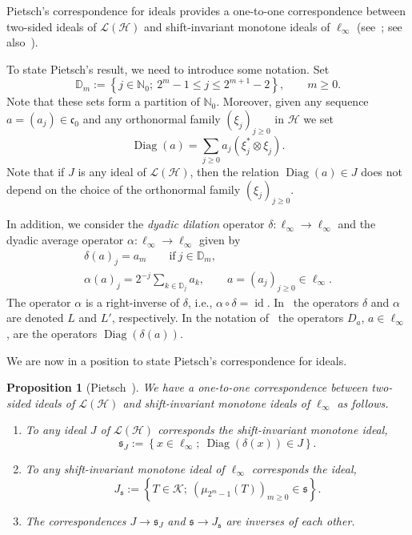 \documentclass[10pt, a4paper]{amsart}
\newcommand{\N}{\mathbb{N}}
\newcommand{\D}{\mathbb{D}}
\newcommand{\sL}{\mathscr{L}}
\newcommand{\sH}{\mathscr{H}}
\newcommand{\sK}{\mathscr{K}}
\newcommand{\fs}{\mathfrak{s}}
\newcommand{\co}{\mathfrak{c}_{0}}
\newcommand{\op}{\operatorname}
\numberwithin{equation}{section}
\newtheorem{proposition}[theorem]{Proposition}
\theoremstyle{definition}
\theoremstyle{remark}
\newcommand{\Diag}{\op{Diag}}
\begin{document}
Pietsch's correspondence for ideals provides a one-to-one correspondence between two-sided ideals of $\sL(\sH)$ and shift-invariant monotone ideals of $\ell_\infty$ (see~\cite{Pi:IEOT17}; see also~\cite{LSZ:Book}).

To state Pietsch's result, we need to introduce some notation. Set
\begin{equation*}
 \D_m:=\left\{j\in \N_0; \ 2^{m}-1\leq j \leq 2^{m+1}-2\right\}, \qquad m\geq 0.
\end{equation*}
Note that these sets form a partition of $\N_0$. Moreover, given any sequence $a=(a_j)\in \co$ and any orthonormal family $(\xi_j)_{j \geq 0}$ in $\sH$ we set
\begin{equation*}
 \Diag(a)= \sum_{j\geq 0} a_j \left(\xi_j^*\otimes \xi_j\right).
\end{equation*}
Note that if $J$ is any ideal of $\sL(\sH)$, then the relation $\Diag(a)\in J$ does not depend on the choice of the orthonormal family $(\xi_j)_{j \geq 0}$.

In addition, we consider the \emph{dyadic dilation} operator $\delta: \ell_\infty \rightarrow \ell_\infty$ and the dyadic average operator $\alpha:\ell_\infty \rightarrow \ell_\infty$ given by
\begin{gather*}
\delta (a)_j=a_m \qquad \text{if} \ j \in \D_m,\\
\alpha (a)_j= 2^{-j}\sum_{k\in \D_j} a_k, \qquad a=(a_j)_{j\geq 0}\in \ell_\infty.
\end{gather*}
The operator $\alpha$ is a right-inverse of $\delta$, i.e., $\alpha\circ \delta=\op{id}$. In~\cite{LSZ:Book} the operators $\delta$ and $\alpha$ are denoted $L$ and $L'$, respectively. In the notation of~\cite{Pi:IEOT17} the operators $D_a$, $a\in \ell_\infty$,  are the operators $\Diag(\delta(a))$.

We are now in a position to state Pietsch's correspondence for ideals.

\begin{proposition}[Pietsch~\cite{Pi:IEOT17}]\label{prop:corpdns on ideals}
 We have a one-to-one correspondence between two-sided ideals of $\sL(\sH)$ and shift-invariant monotone ideals of $\ell_\infty$ as follows.
 \begin{enumerate}
 \item To any ideal $J$ of $\sL(\sH)$ corresponds the shift-invariant monotone ideal,
 \begin{equation*}
 \fs_J:=\left\{ x\in \ell_\infty; \ \Diag\left(\delta(x)\right)\in J\right\}.
\end{equation*}

\item To any shift-invariant monotone ideal of $\ell_\infty$ corresponds the ideal,
\begin{equation*}
 J_\fs:= \left\{T\in \sK; \ \left(\mu_{2^m-1}(T)\right)_{m\geq 0}\in \fs\right\}.
\end{equation*}

\item The correspondences $J\rightarrow \fs_J$ and $\fs\rightarrow J_\fs$ are inverses of each other.
\end{enumerate}
\end{proposition}
\end{document}
